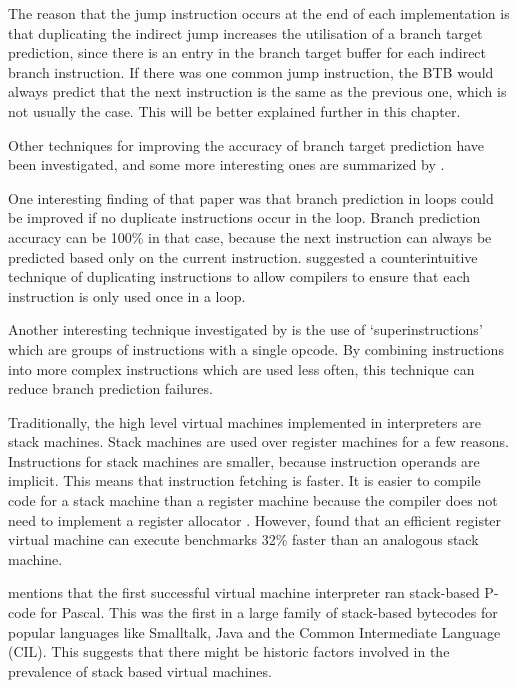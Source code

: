 		The reason that the jump instruction occurs at the end of each implementation is that duplicating the indirect jump increases the utilisation of a branch target prediction, since there is an entry in the branch target buffer for each indirect branch instruction. If there was one common jump instruction, the BTB would always predict that the next instruction is the same as the previous one, which is not usually the case. This will be better explained further in this chapter.
		
		Other techniques for improving the accuracy of branch target prediction have been investigated, and some more interesting ones are summarized by \cite{optimizingindirectbranch}. 
		
		One interesting finding of that paper was that branch prediction in loops could be improved if no duplicate instructions occur in the loop. Branch prediction accuracy can be 100\% in that case, because the next instruction can always be predicted based only on the current instruction. \citeauthor{optimizingindirectbranch} suggested a counterintuitive technique of duplicating instructions to allow compilers to ensure that each instruction is only used once in a loop.
		
		Another interesting technique investigated by \citeauthor{optimizingindirectbranch} is the use of `superinstructions' which are groups of instructions with a single opcode. By combining instructions into more complex instructions which are used less often, this technique can reduce branch prediction failures.
		
		Traditionally, the high level virtual machines implemented in interpreters are stack machines. Stack machines are used over register machines for a few reasons. Instructions for stack machines are smaller, because instruction operands are implicit. This means that instruction fetching is faster. It is easier to compile code for a stack machine than a register machine because the compiler does not need to implement a register allocator \citep{caseregistervm}. However, \cite{stackregistershowdown} found that an efficient register virtual machine can execute benchmarks 32\% faster than an analogous stack machine. 
		
		\cite{caseregistervm} mentions that the first successful virtual machine interpreter ran stack-based P-code for Pascal. This was the first in a large family of stack-based bytecodes for popular languages like Smalltalk, Java and the Common Intermediate Language (CIL). This suggests that there might be historic factors involved in the prevalence of stack based virtual machines.
		
